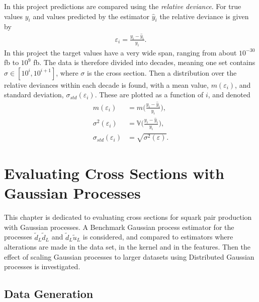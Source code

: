 \documentclass[twoside,english]{uiofysmaster}
\begin{document}
In this project predictions are compared using the \textit{relative deviance}. For true values $y_i$ and values predicted by the estimator $\hat{y}_i$ the relative deviance is given by
\begin{align}\label{Eq:: gaussian process : Relative deviance}
\varepsilon_i = \frac{y_i - \hat{y}_i}{y_i}.
\end{align} 
In this project the target values have a very wide span, ranging from about $10^{-30}$ fb to $10^9$ fb. The data is therefore divided into decades, meaning one set contains $\sigma \in [10^i, 10^{i+1}]$, where $\sigma$ is the cross section. Then a distribution over the relative deviances within each decade is found, with a mean value, $m(\varepsilon_i)$, and standard deviation, $\sigma_{std}(\varepsilon_i)$. These are plotted as a function of $i$, and denoted
\begin{align}
m(\varepsilon_i) &= m \Big(\frac{y_i - \hat{y}_i}{y_i}\Big),\label{Eq:: gaussian process : rel deviance mean} \\
\sigma^2 (\varepsilon_i) &= \mathbb{V} \Big(\frac{y_i - \hat{y}_i}{y_i}\Big),\label{Eq:: gaussian process : rel deviance variance}\\
\sigma_{std}(\varepsilon_i) &= \sqrt{\sigma^2(\varepsilon)}.
\end{align} 







\chapter{Evaluating Cross Sections with Gaussian Processes}

This chapter is dedicated to evaluating cross sections for squark pair production with Gaussian processes. A Benchmark Gaussian process estimator for the processes $\tilde{d}_L \tilde{d}_L$ and $\tilde{d}_L \tilde{u}_L$ is considered, and compared to estimators where alterations are made in the data set, in the kernel and in the features. Then the effect of scaling Gaussian processes to larger datasets using Distributed Gaussian processes is investigated.

\section{Data Generation}
\end{document}
